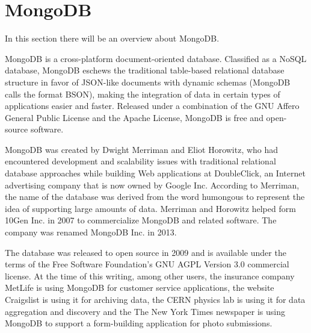 \section{MongoDB}
\label{sec:TCH_mongodb}

In this section there will be an overview about MongoDB.

MongoDB is a cross-platform document-oriented database. Classified as a NoSQL database, 
MongoDB eschews the traditional table-based relational database structure in favor of JSON-like documents with dynamic schemas (MongoDB calls the format BSON), making the integration of data in certain types of applications easier and faster. Released under a combination of the GNU Affero General Public License and the Apache License, MongoDB is free and open-source software.

MongoDB was created by Dwight Merriman and Eliot Horowitz, who had encountered development and scalability issues with traditional relational database approaches while building Web applications at DoubleClick, an Internet advertising company that is now owned by Google Inc. According to Merriman, the name of the database was derived from the word humongous to represent the idea of supporting large amounts of data. Merriman and Horowitz helped form 10Gen Inc. in 2007 to commercialize MongoDB and related software. The company was renamed MongoDB Inc. in 2013. 

The database was released to open source in 2009 and is available under the terms of the Free Software Foundation's GNU AGPL Version 3.0 commercial license. At the time of this writing, among other users, the insurance company MetLife is using MongoDB for customer service applications, the website Craigslist is using it for archiving data, the CERN physics lab is using it for data aggregation and discovery and the The New York Times newspaper is using MongoDB to support a form-building application for photo submissions.